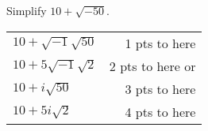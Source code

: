 

{
	Simplify $10+\sqrt{-50}$.
}
{
	\begin{tabular}{l r}
	$10+\sqrt{-1}\sqrt{50}$ & 1 pts to here\\
	$10+5\sqrt{-1}\sqrt{2}$ & 2 pts to here or\\
	$10+i\sqrt{50}$ & 3 pts to here\\
	$10+5i\sqrt{2}$ & 4 pts to here
	\end{tabular}
}
